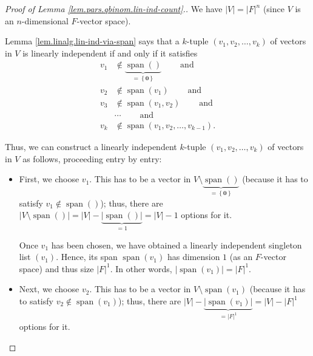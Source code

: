 \begin{proof}
[Proof of Lemma \ref{lem.pars.qbinom.lin-ind-count}.]We have $\left\vert
V\right\vert =\left\vert F\right\vert ^{n}$ (since $V$ is an $n$-dimensional
$F$-vector space).

Lemma \ref{lem.linalg.lin-ind-via-span} says that a $k$-tuple $\left(
v_{1},v_{2},\ldots,v_{k}\right)  $ of vectors in $V$ is linearly independent
if and only if it satisfies%
\begin{align*}
v_{1}  &  \notin\underbrace{\operatorname*{span}\left(  {}\right)
}_{=\left\{  \mathbf{0}\right\}  }\ \ \ \ \ \ \ \ \ \ \text{and}\\
v_{2}  &  \notin\operatorname*{span}\left(  v_{1}\right)
\ \ \ \ \ \ \ \ \ \ \text{and}\\
v_{3}  &  \notin\operatorname*{span}\left(  v_{1},v_{2}\right)
\ \ \ \ \ \ \ \ \ \ \text{and}\\
&  \cdots\ \ \ \ \ \ \ \ \ \ \text{and}\\
v_{k}  &  \notin\operatorname*{span}\left(  v_{1},v_{2},\ldots,v_{k-1}\right)
.
\end{align*}


Thus, we can construct a linearly independent $k$-tuple $\left(  v_{1}%
,v_{2},\ldots,v_{k}\right)  $ of vectors in $V$ as follows, proceeding entry
by entry:

\begin{itemize}
\item First, we choose $v_{1}$. This has to be a vector in $V\setminus
\underbrace{\operatorname*{span}\left(  {}\right)  }_{=\left\{  \mathbf{0}%
\right\}  }$ (because it has to satisfy $v_{1}\notin\operatorname*{span}%
\left(  {}\right)  $); thus, there are $\left\vert V\setminus
\operatorname*{span}\left(  {}\right)  \right\vert =\left\vert V\right\vert
-\underbrace{\left\vert \operatorname*{span}\left(  {}\right)  \right\vert
}_{=1}=\left\vert V\right\vert -1$ options for it.

Once $v_{1}$ has been chosen, we have obtained a linearly independent
singleton list $\left(  v_{1}\right)  $. Hence, its span $\operatorname*{span}%
\left(  v_{1}\right)  $ has dimension $1$ (as an $F$-vector space) and thus
size $\left\vert F\right\vert ^{1}$. In other words, $\left\vert
\operatorname*{span}\left(  v_{1}\right)  \right\vert =\left\vert F\right\vert
^{1}$.

\item Next, we choose $v_{2}$. This has to be a vector in $V\setminus
\operatorname*{span}\left(  v_{1}\right)  $ (because it has to satisfy
$v_{2}\notin\operatorname*{span}\left(  v_{1}\right)  $); thus, there are
$\left\vert V\right\vert -\underbrace{\left\vert \operatorname*{span}\left(
v_{1}\right)  \right\vert }_{=\left\vert F\right\vert ^{1}}=\left\vert
V\right\vert -\left\vert F\right\vert ^{1}$ options for it.


\end{itemize}
\end{proof}
